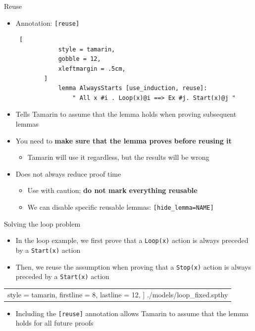 \documentclass[11pt,aspectratio=169]{beamer}
\begin{document}
\begin{frame}[fragile,t]{Reuse}
    \begin{itemize}
        \item Annotation: \texttt{[reuse]}
        \vspace*{.5cm}
        \begin{lstlisting} [
            style = tamarin,
            gobble = 12,
            xleftmargin = .5cm,
        ]
            lemma AlwaysStarts [use_induction, reuse]:
                " All x #i . Loop(x)@i ==> Ex #j. Start(x)@j "
        \end{lstlisting}
        \item Tells Tamarin to assume that the lemma holds when proving 
              subsequent lemmas
        \item You need to \textbf{make sure that the lemma proves before 
                                  reusing it}
        \begin{itemize}
            \item Tamarin will use it regardless, but the results will be wrong
        \end{itemize}
        \item Does not always reduce proof time
        \begin{itemize}
            \item Use with caution; \textbf{do not mark everything reusable}
            \item We can disable specific reusable lemmas:
                  \texttt{[hide\_lemma=NAME]}
        \end{itemize}
    \end{itemize}
\end{frame}

\begin{frame}[fragile]{Solving the loop problem}
    \begin{itemize}
        \item In the loop example, we first prove that a \texttt{Loop(x)} 
              action is always preceded by a \texttt{Start(x)} action
        \item Then, we reuse the assumption when proving that a
              \texttt{Stop(x)} action is always preceded by a \texttt{Start(x)} 
              action
    \end{itemize}
    \begin{center}
        \begin{tabular}{c}
            
                style = tamarin,
                firstline =  8,
                lastline  = 12,
            ] {./models/loop_fixed.spthy}
        \end{tabular}
    \end{center}
    \begin{itemize}
        \item Including the \texttt{[reuse]} annotation allows Tamarin to 
              assume that the lemma holds for all future proofs
    \end{itemize}
\end{frame}
\end{document}
